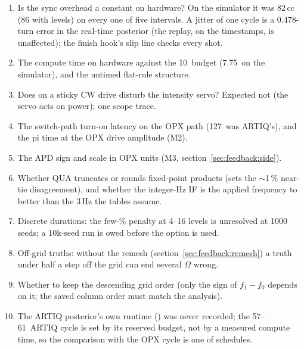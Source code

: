 \begin{enumerate}[nosep]
  \item Is the sync overhead a constant on hardware? On the simulator it was
    82\,cc (86 with levels) on every one of five intervals. A jitter of one
    cycle is a 0.478-turn error in the real-time posterior (the replay, on
    the timestamps, is unaffected); the finish hook's slip line checks every
    shot.
  \item The compute time on hardware against the 10\us\ budget (7.75\us\ on
    the simulator), and the untimed flat-rule structure.
  \item Does  on a sticky CW drive disturb the intensity
    servo? Expected not (the servo acts on power); one scope trace.
  \item The switch-path turn-on latency on the OPX path (127\nsu\ was
    ARTIQ's), and the pi time at the OPX drive amplitude (M2).
  \item The APD sign and scale in OPX units (M3,
    section~\ref{sec:feedback:side}).
  \item Whether QUA truncates or rounds fixed-point products (sets the
    $\sim$1\,\% near-tie disagreement), and whether the integer-Hz IF is the
    applied frequency to better than the 3\,Hz the tables assume.
  \item Discrete durations: the few-\% penalty at 4--16 levels is unresolved at
    1000 seeds; a 10k-seed run is owed before the option is used.
  \item Off-grid truths: without the remesh (section~\ref{sec:feedback:remesh})
    a truth under half a step off the grid can end several $\Omega$ wrong.
  \item Whether to keep the descending grid order (only the sign of $f_1 - f_0$
    depends on it; the saved column order must match the analysis).
  \item The ARTIQ posterior's own runtime () was never
    recorded; the 57--61\us\ ARTIQ cycle is set by its reserved budget, not by
    a measured compute time, so the comparison with the OPX cycle is one of
    schedules.
\end{enumerate}
